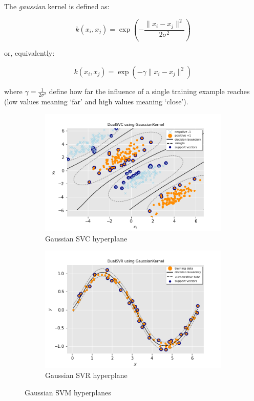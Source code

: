 The \emph{gaussian} kernel is defined as:

\begin{equation} \label{eq:gaussian_kernel1}
	k(x_i,x_j)=\exp(-\frac{\|x_i-x_j\|^2}{2\sigma^2})
\end{equation}

or, equivalently:

\begin{equation} \label{eq:gaussian_kernel2}
	k(x_i,x_j)=\exp(-\gamma \|x_i-x_j\|^2)
\end{equation}

where $\displaystyle \gamma=\frac{1}{2\sigma^2}$ define how far the influence of a single training example reaches (low values meaning ‘far’ and high values meaning ‘close’).

\begin{figure}[h!]
	\centering
	\begin{subfigure}{.49\textwidth}
		\centering
		\includegraphics[width=\textwidth]{img/gaussian_dual_svc_hyperplane}
		\caption{Gaussian SVC hyperplane}
		\label{fig:gaussian_dual_svc_hyperplane}
	\end{subfigure}
	\begin{subfigure}{.49\textwidth}
		\centering
		\captionsetup{justification=centering}
		\includegraphics[width=\textwidth]{img/gaussian_dual_svr_hyperplane}
		\caption{Gaussian SVR hyperplane}
		\label{fig:gaussian_dual_svr_hyperplane}
	\end{subfigure}
\caption{Gaussian SVM hyperplanes}
\end{figure}